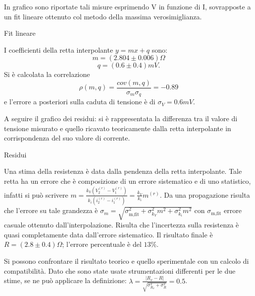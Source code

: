 In grafico sono riportate tali misure esprimendo V in funzione di I, sovrapposte a un fit lineare ottenuto col metodo della massima verosimiglianza.

\begin{grafico}
\centering

\caption{Fit lineare}
\label{fig:fitlin}
\end{grafico}

I coefficienti della retta interpolante $y=mx+q$ sono:
\[m = (2.804 \pm 0.006) \Omega \]
\[q = (0.6 \pm 0.4) mV.\]
Si \`e calcolata la correlazione 
\[\rho(m, q) = \frac{cov(m, q)}{\sigma_m \sigma_q}=-0.89\]
e l'errore a posteriori sulla caduta di tensione \`e di $\sigma_V=0.6mV$.

A seguire il grafico dei residui: si \`e rappresentata la differenza tra il valore di tensione misurato e quello ricavato teoricamente dalla retta interpolante in corrispondenza del suo valore di corrente.

\begin{grafico}
\centering

\caption{Residui}
\label{fig:residui}
\end{grafico}

Una stima della resistenza \`e data dalla pendenza della retta interpolante. Tale retta ha un errore che \`e composizione di un errore sistematico e di uno statistico, infatti si pu\`o scrivere $m=\frac{k_V (V_2^{(r)}-V_1^{(r)})}{k_i (i_2^{(r)} - i_1^{(r)})}=\frac{k_V}{k_i}m^{(r)}$.
Da una propagazione risulta che l'errore su tale grandezza \`e $\sigma_m=\sqrt{\sigma_{\textrm{m,fit}}^2 + \sigma_{k_V}^2 m^2 + \sigma_{k_i}^2 m^2}$ con $\sigma_{\textrm{m,fit}}$ errore casuale ottenuto dall'interpolazione.
Risulta che l'incertezza sulla resistenza \`e quasi completamente data dall'errore sistematico. Il risultato finale \`e $R=(2.8 \pm 0.4) \Omega$; l'errore percentuale \`e del $13 \%$.

Si possono confrontare il risultato teorico e quello sperimentale con un calcolo di compatibilit\`a. Dato che sono state usate strumentazioni differenti per le due stime, se ne pu\`o applicare la definizione: 
$\lambda=\frac{|R_x - R|}{\sqrt{\sigma_{R_x}^2+\sigma_R^2}}=0.5$.
 











